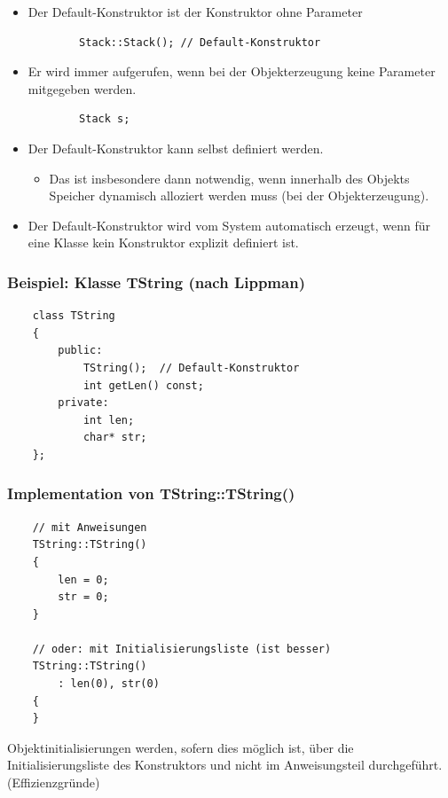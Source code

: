 \label{sec:Default-Konstruktor}
\begin{itemize}
	\item Der Default-Konstruktor ist der Konstruktor ohne Parameter\\
	\begin{minipage}{\linewidth}
		\begin{lstlisting}
		Stack::Stack();	// Default-Konstruktor
		\end{lstlisting}
	\end{minipage}
	\item Er wird immer aufgerufen, wenn bei der Objekterzeugung keine Parameter mitgegeben werden.\\
	\begin{minipage}{\linewidth}
		\begin{lstlisting}
		Stack s;
		\end{lstlisting}
	\end{minipage}
	\item Der Default-Konstruktor kann selbst definiert werden.
	\begin{itemize}
		\item Das ist insbesondere dann notwendig, wenn innerhalb des Objekts Speicher dynamisch alloziert werden muss (bei der Objekterzeugung).
	\end{itemize}
	\item Der Default-Konstruktor wird vom System automatisch erzeugt, wenn für eine Klasse kein Konstruktor explizit definiert ist.
\end{itemize}

\subsubsection{Beispiel: Klasse TString (nach Lippman)}
\label{sec:Beispiel: Klasse TString }
\noindent
\begin{minipage}{\linewidth}
	\begin{lstlisting}
	class TString
	{
		public:		
			TString();	// Default-Konstruktor
			int getLen() const;
		private:
			int len;
			char* str;
	};
	\end{lstlisting}	
\end{minipage}

\subsubsection{Implementation von TString::TString()}
\label{sec:Implementation von TString::TString()}
\noindent
\begin{minipage}{\linewidth}
	\begin{lstlisting}
	// mit Anweisungen
	TString::TString()
	{
		len = 0;
		str = 0;
	}
	
	// oder: mit Initialisierungsliste (ist besser)
	TString::TString()
		: len(0), str(0)
	{
	}
	\end{lstlisting}
\end{minipage}
\begin{hinweis}
	Objektinitialisierungen werden, sofern dies möglich ist, über die Initialisierungsliste des Konstruktors und nicht im Anweisungsteil durchgeführt. (Effizienzgründe)
\end{hinweis}

